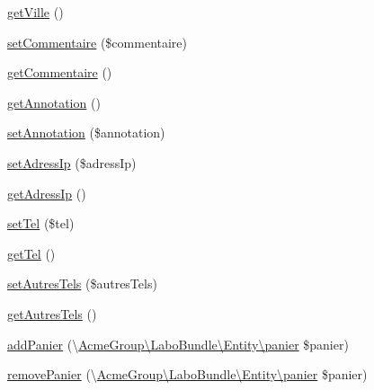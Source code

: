 \begin{DoxyCompactItemize}
\item 
\hyperlink{class_acme_group_1_1_user_bundle_1_1_entity_1_1_user_aa0afce62f32063caf9b35cae29ef057e}{get\+Ville} ()
\item 
\hyperlink{class_acme_group_1_1_user_bundle_1_1_entity_1_1_user_aaddd34e51a896c0296433077bd2ce6e5}{set\+Commentaire} (\$commentaire)
\item 
\hyperlink{class_acme_group_1_1_user_bundle_1_1_entity_1_1_user_a058e05098a637da82e03137e65092ef1}{get\+Commentaire} ()
\item 
\hyperlink{class_acme_group_1_1_user_bundle_1_1_entity_1_1_user_a77c0242fd712c47d97d0cdd410662338}{get\+Annotation} ()
\item 
\hyperlink{class_acme_group_1_1_user_bundle_1_1_entity_1_1_user_adf4b2d4838232ee20fbf5af45693d737}{set\+Annotation} (\$annotation)
\item 
\hyperlink{class_acme_group_1_1_user_bundle_1_1_entity_1_1_user_a18885d9f1e9165ef8c64e1c23defeb8d}{set\+Adress\+Ip} (\$adress\+Ip)
\item 
\hyperlink{class_acme_group_1_1_user_bundle_1_1_entity_1_1_user_ab4f183c37e328d123a7dfb99ddf73e1f}{get\+Adress\+Ip} ()
\item 
\hyperlink{class_acme_group_1_1_user_bundle_1_1_entity_1_1_user_a38c290c40a4c79ca96a6eb9ae7811aeb}{set\+Tel} (\$tel)
\item 
\hyperlink{class_acme_group_1_1_user_bundle_1_1_entity_1_1_user_af70f80deb695c3188e951a3ba1586b16}{get\+Tel} ()
\item 
\hyperlink{class_acme_group_1_1_user_bundle_1_1_entity_1_1_user_af7d1ad536d645e9cfe61cc91a566d79d}{set\+Autres\+Tels} (\$autres\+Tels)
\item 
\hyperlink{class_acme_group_1_1_user_bundle_1_1_entity_1_1_user_ad74af3a491944844c09704ca82a7be1b}{get\+Autres\+Tels} ()
\item 
\hyperlink{class_acme_group_1_1_user_bundle_1_1_entity_1_1_user_a576b12b680ccbe8a734d492d10ee4d3a}{add\+Panier} (\textbackslash{}\hyperlink{class_acme_group_1_1_labo_bundle_1_1_entity_1_1panier}{Acme\+Group\textbackslash{}\+Labo\+Bundle\textbackslash{}\+Entity\textbackslash{}panier} \$panier)
\item 
\hyperlink{class_acme_group_1_1_user_bundle_1_1_entity_1_1_user_aa3c35dd6380f4665c737c7c66134ceb0}{remove\+Panier} (\textbackslash{}\hyperlink{class_acme_group_1_1_labo_bundle_1_1_entity_1_1panier}{Acme\+Group\textbackslash{}\+Labo\+Bundle\textbackslash{}\+Entity\textbackslash{}panier} \$panier)
\item 

\end{DoxyCompactItemize}
